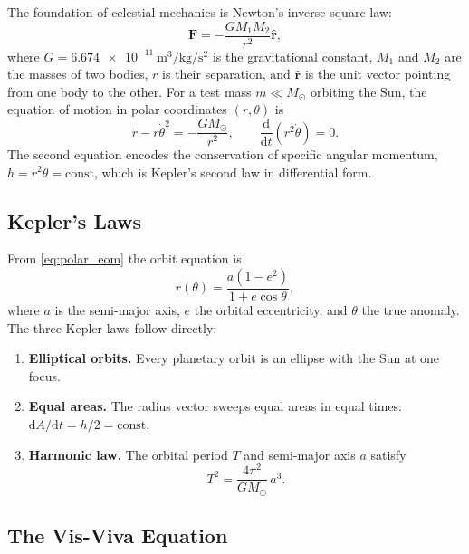 \documentclass[12pt,a4paper]{article}
\newcommand{\dd}{\mathrm{d}}
\begin{document}
The foundation of celestial mechanics is Newton's inverse-square law:
\begin{equation}
  \bm{F} = -\frac{GM_1 M_2}{r^2}\hat{\bm{r}},
  \label{eq:newton}
\end{equation}
where $G = \SI{6.674e-11}{\meter\cubed\per\kilo\gram\per\second\squared}$ is
the gravitational constant, $M_1$ and $M_2$ are the masses of two bodies, $r$
is their separation, and $\hat{\bm{r}}$ is the unit vector pointing from one
body to the other. For a test mass $m \ll M_\odot$ orbiting the Sun, the
equation of motion in polar coordinates $(r, \theta)$ is
\begin{equation}
  \ddot{r} - r\dot{\theta}^2 = -\frac{GM_\odot}{r^2}, \qquad
  \frac{\dd}{\dd t}(r^2\dot{\theta}) = 0.
  \label{eq:polar_eom}
\end{equation}
The second equation encodes the conservation of specific angular momentum,
$h = r^2\dot{\theta} = \text{const}$, which is Kepler's second law in
differential form.

\subsection{Kepler's Laws}

From \eqref{eq:polar_eom} the orbit equation is
\begin{equation}
  r(\theta) = \frac{a(1-e^2)}{1 + e\cos\theta},
  \label{eq:orbit_eq}
\end{equation}
where $a$ is the semi-major axis, $e$ the orbital eccentricity, and $\theta$ the
true anomaly. The three Kepler laws follow directly:
\begin{enumerate}[label=\textbf{K\arabic*.}]
  \item \textbf{Elliptical orbits.} Every planetary orbit is an ellipse with
    the Sun at one focus.
  \item \textbf{Equal areas.} The radius vector sweeps equal areas in equal
    times: $\dd A/\dd t = h/2 = \text{const}$.
  \item \textbf{Harmonic law.} The orbital period $T$ and semi-major axis $a$
    satisfy
    \begin{equation}
      T^2 = \frac{4\pi^2}{GM_\odot}\,a^3.
      \label{eq:kepler3}
    \end{equation}
\end{enumerate}

\subsection{The Vis-Viva Equation}
\end{document}
